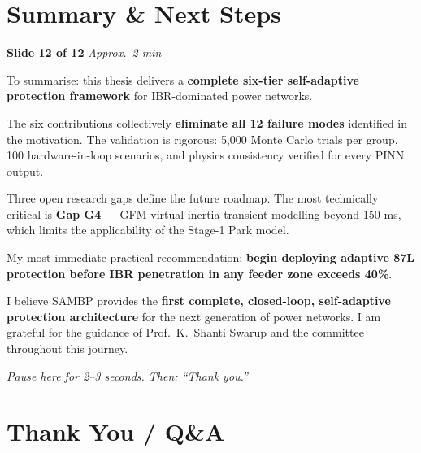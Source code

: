\documentclass[12pt, a4paper]{article}
\newenvironment{notebox}{%
  \begin{tcolorbox}[
    colback=noteBg,
    colframe=iitmMaroon!40,
    boxrule=0.6pt,
    arc=3pt,
    left=8pt, right=8pt, top=6pt, bottom=6pt
  ]
  \setstretch{1.4}\small
}{%
  \end{tcolorbox}
}
\newcommand{\slidetag}[2]{%
  \noindent
  \textcolor{slideNum}{\footnotesize\bfseries Slide #1} \hfill
  \textcolor{iitmGold!80!black}{\footnotesize\itshape Approx.\ #2}\\[2pt]
}
\begin{document}
\section{Summary \& Next Steps}

\slidetag{12 of 12}{2 min}
\begin{notebox}
To summarise: this thesis delivers a \textbf{complete six-tier self-adaptive protection
framework} for IBR-dominated power networks.

The six contributions collectively \textbf{eliminate all 12 failure modes} identified in
the motivation. The validation is rigorous: 5{,}000 Monte Carlo trials per group, 100
hardware-in-loop scenarios, and physics consistency verified for every PINN output.

Three open research gaps define the future roadmap. The most technically critical is
\textbf{Gap G4} --- GFM virtual-inertia transient modelling beyond 150 ms, which limits
the applicability of the Stage-1 Park model.

My most immediate practical recommendation: \textbf{begin deploying adaptive 87L
protection before IBR penetration in any feeder zone exceeds 40\%}.

I believe SAMBP provides the \textbf{first complete, closed-loop, self-adaptive
protection architecture} for the next generation of power networks. I am grateful for
the guidance of Prof.\ K.\ Shanti Swarup and the committee throughout this journey.

\textit{Pause here for 2--3 seconds. Then: ``Thank you.''}
\end{notebox}

\section*{Thank You / Q\&A}
\end{document}
